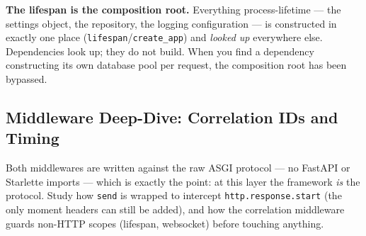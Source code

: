 \begin{keyconceptbox}
\textbf{The lifespan is the composition root.} Everything process-lifetime
--- the settings object, the repository, the logging configuration --- is
constructed in exactly one place (\texttt{lifespan}/\texttt{create\_app}) and
\emph{looked up} everywhere else. Dependencies look up; they do not build.
When you find a dependency constructing its own database pool per request,
the composition root has been bypassed.
\end{keyconceptbox}

\subsection{Middleware Deep-Dive: Correlation IDs and Timing}
\label{sec:ch6-code-middleware}

Both middlewares are written against the raw ASGI protocol --- no FastAPI or
Starlette imports --- which is exactly the point: at this layer the framework
\emph{is} the protocol. Study how \texttt{send} is wrapped to intercept
\texttt{http.response.start} (the only moment headers can still be added),
and how the correlation middleware guards non-HTTP scopes (lifespan,
websocket) before touching anything.

